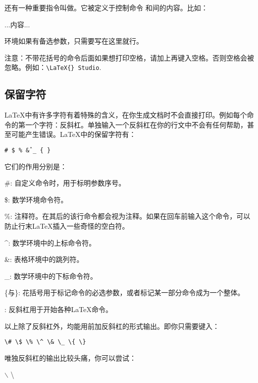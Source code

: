 还有一种重要指令叫做。它被定义于控制命令 和间的内容。比如：
\begin{latex}

...内容...

\end{latex}

环境如果有备选参数，只需要写在这里就行。

注意：不带花括号的命令后面如果想打印空格，请加上再键入空格。否则空格会被忽略。例如：\verb+\LaTeX{} Studio+.

\subsection{保留字符}

\LaTeX 中有许多字符有着特殊的含义，在你生成文档时不会直接打印。例如每个命令的第一个字符：反斜杠。单独输入一个反斜杠在你的行文中不会有任何帮助，甚至可能产生错误。\LaTeX 中的保留字符有：
\begin{center}
\texttt{\# \$ \% \^ \& \_ \{ \} }
\end{center}

它们的作用分别是：
\begin{para}
\item[\#{}:] 自定义命令时，用于标明参数序号。
\item[\${}:] 数学环境命令符。
\item[\%{}:] 注释符。在其后的该行命令都会视为注释。如果在回车前输入这个命令，可以防止行末\LaTeX 插入一些奇怪的空白符。
\item[\^{}:] 数学环境中的上标命令符。
\item[\&{}:] 表格环境中的跳列符。
\item[\_{}:] 数学环境中的下标命令符。
\item[\{与\}:] 花括号用于标记命令的必选参数，或者标记某一部分命令成为一个整体。
\item[\char92{}:] 反斜杠用于开始各种\LaTeX 命令。
\end{para}

以上除了反斜杠外，均能用前加反斜杠的形式输出。即你只需要键入：
\begin{center}
\verb|\# \$ \% \^ \& \_ \{ \}|
\end{center}

唯独反斜杠的输出比较头痛，你可以尝试：
\begin{codeshow}
$\backslash$ \textbackslash
\texttt{}
\end{codeshow}

